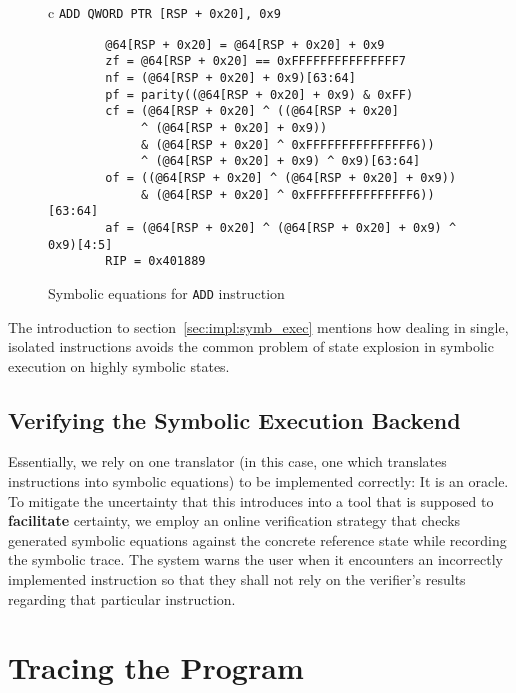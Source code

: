 \begin{figure}[htbp]
    \centering
    \begin{tabular}{c}
    \texttt{ADD        QWORD PTR [RSP + 0x20], 0x9} \\
    \midrule
    \begin{lstlisting}
        @64[RSP + 0x20] = @64[RSP + 0x20] + 0x9
        zf = @64[RSP + 0x20] == 0xFFFFFFFFFFFFFFF7
        nf = (@64[RSP + 0x20] + 0x9)[63:64]
        pf = parity((@64[RSP + 0x20] + 0x9) & 0xFF)
        cf = (@64[RSP + 0x20] ^ ((@64[RSP + 0x20]
             ^ (@64[RSP + 0x20] + 0x9))
             & (@64[RSP + 0x20] ^ 0xFFFFFFFFFFFFFFF6))
             ^ (@64[RSP + 0x20] + 0x9) ^ 0x9)[63:64]
        of = ((@64[RSP + 0x20] ^ (@64[RSP + 0x20] + 0x9))
             & (@64[RSP + 0x20] ^ 0xFFFFFFFFFFFFFFF6))[63:64]
        af = (@64[RSP + 0x20] ^ (@64[RSP + 0x20] + 0x9) ^ 0x9)[4:5]
        RIP = 0x401889
    \end{lstlisting}
    \end{tabular}
    \caption[]{Symbolic equations for \texttt{ADD} instruction}\label{fig:symb_equation_add}
\end{figure}

The introduction to section~\ref{sec:impl:symb_exec} mentions how dealing in single, isolated instructions avoids the
common problem of state explosion in symbolic execution on highly symbolic states.

\subsection{Verifying the Symbolic Execution Backend}\label{sec:impl:symb_exec_backend}

Essentially, we rely on one translator (in this case, one which translates instructions into symbolic equations) to be
implemented correctly: It is an oracle. To mitigate the uncertainty that this introduces into a tool that is supposed to
\textbf{facilitate} certainty, we employ an online verification strategy that checks generated symbolic equations
against the concrete reference state while recording the symbolic trace. The system warns the user when it encounters an
incorrectly implemented instruction so that they shall not rely on the verifier's results regarding that particular
instruction.

\section{Tracing the Program}

